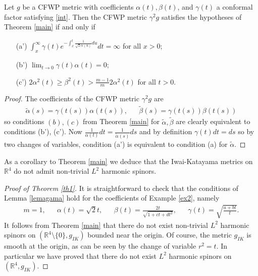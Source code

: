 \documentclass[12pt]{amsart}
\begin{document}
\begin{lemma}\label{lemagama}
Let $g$ be a CFWP metric with coefficients $\alpha(t), \beta(t)$, 
and $\gamma(t)$ a conformal factor satisfying \eqref{int}. Then 
the CFWP metric $\gamma^2g$ satisfies the hypotheses of Theorem \ref{main}
if and only if
\begin{enumerate}
\item[(a')] $\displaystyle\int_x^\infty \gamma(t)
e^{-\int_x^t\frac{1}{\sqrt{2}{\alpha}(u)}du}dt=\infty$
for all $x>0$;
\item[(b')] $\displaystyle\lim_{t\to 0} \gamma(t){\alpha}(t)=0$;
\item[(c')] $\displaystyle2{\alpha}^2(t)\geq {\beta}^2(t)>\tfrac{m-1}{m}2{\alpha}^2(t)$ for all $t>0$.
\end{enumerate}
\end{lemma}
\begin{proof}
The coefficients of the CFWP metric $\gamma^2g$ are
\begin{align*}
\tilde{\alpha}(s)=\gamma(t(s))\alpha(t(s)),&&\tilde{\beta}(s)=\gamma(t(s))\beta(t(s))
\end{align*}
so conditions $(b),(c)$ from Theorem \ref{main}
for $\tilde{\alpha}, \tilde{\beta}$ are clearly equivalent 
to conditions (b'), (c'). Now 
$\frac{1}{{\alpha}(t)}dt=\frac{1}{\tilde{\alpha}(s)}ds$ and by definition $\gamma(t)dt=ds$
so by two changes of variables, condition (a') is equivalent to condition
(a) for $\tilde{\alpha}$.
\end{proof}

As a corollary to Theorem \ref{main} we deduce that the Iwai-Katayama metrics
on ${{\mathbb R}}^4$ do not admit non-trivial $L^2$ harmonic spinors. 

\begin{proof}[Proof of Theorem \ref{th1}]
It is straightforward to check that the conditions of Lemma \ref{lemagama} 
hold for the coefficients of Example \ref{ex2}, namely
\begin{align*}
m=1,&&\alpha(t)=\sqrt{2}t,&& {\beta}(t)=\tfrac{2t}{\sqrt{1+ct+dt^2}},&&
\gamma(t)=\sqrt{\tfrac{a+bt}{t}}.
\end{align*}
It follows from
Theorem \ref{main} that there do not exist non-trivial $L^2$ harmonic 
spinors on $({{\mathbb R}}^4\setminus\{0\}, g_{IK})$ bounded near the origin. 
Of course, the metric $g_{IK}$ is smooth at the origin, as can be 
seen by the change of variable $r^2=t$.
In particular we have proved that there do not exist $L^2$ harmonic 
spinors on $({{\mathbb R}}^4,g_{IK})$. 
\end{proof} 
\end{document}
